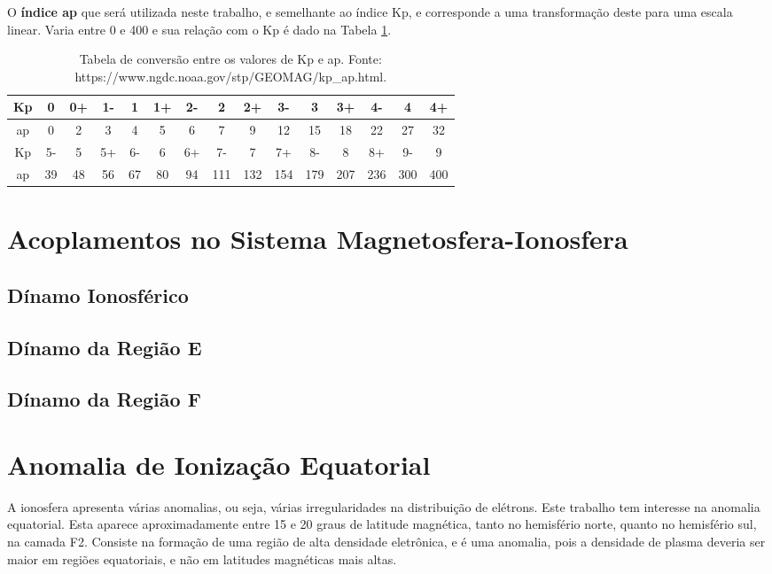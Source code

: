 O {\bf índice ap} que será utilizada neste trabalho, e semelhante ao índice Kp, e corresponde a uma transformação deste para uma escala linear. Varia entre 0 e 400 e sua relação com o Kp é dado na Tabela \ref{tab:kptoap}.

\begin{table}[hhh]
\begin{tabular}{|c|c|c|c|c|c|c|c|c|c|c|c|c|c|c|} \hline
Kp & 0  & 0+ & 1- & 1  & 1+ & 2- & 2   & 2+  & 3-  & 3   & 3+  & 4-  & 4   & 4+  \\ \hline
ap & 0  & 2  & 3  & 4  & 5  & 6  & 7   & 9   & 12  & 15  & 18  & 22  & 27  & 32  \\ \hline
Kp & 5- & 5  & 5+ & 6- & 6  & 6+ & 7-  & 7   & 7+  & 8-  & 8   & 8+  & 9-  & 9   \\ \hline
ap & 39 & 48 & 56 & 67 & 80 & 94 & 111 & 132 & 154 & 179 & 207 & 236 & 300 & 400 \\ \hline
\end{tabular}
\caption{Tabela de conversão entre os valores de Kp e ap. Fonte: https://www.ngdc.noaa.gov/stp/GEOMAG/kp\_ap.html.}
\label{tab:kptoap}
\end{table}

\section{Acoplamentos no Sistema Magnetosfera-Ionosfera}

\subsection{Dínamo Ionosférico}

\subsection{Dínamo da Região E}

\subsection{Dínamo da Região F}

\section{Anomalia de Ionização Equatorial}

A ionosfera apresenta várias anomalias, ou seja, várias irregularidades na distribuição de elétrons. Este trabalho tem interesse na anomalia equatorial. Esta aparece aproximadamente entre 15 e 20 graus de latitude magnética, tanto no hemisfério norte, quanto no hemisfério sul, na camada F2. Consiste na formação de uma região de alta densidade eletrônica, e é uma anomalia, pois a densidade de plasma deveria ser maior em regiões equatoriais, e não em latitudes magnéticas mais altas.

